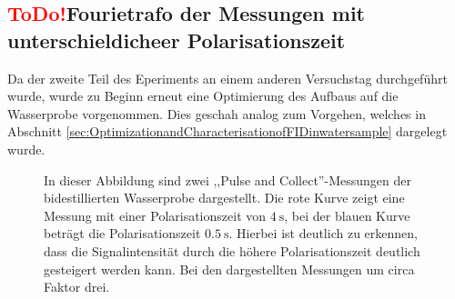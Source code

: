 \subsection{\textcolor{red}{ToDo!}Fourietrafo der Messungen mit unterschieldicheer Polarisationszeit}
\label{sec:Signalintensitaet}
Da der zweite Teil des Eperiments an einem anderen Versuchstag durchgeführt wurde, wurde zu Beginn erneut eine Optimierung des Aufbaus auf die Wasserprobe vorgenommen. Dies geschah analog zum Vorgehen, welches in Abschnitt \ref{sec:OptimizationandCharacterisationofFIDinwatersample} dargelegt wurde.
\begin{figure}[H]
    \centering
    
    \caption[Abhängigkeit der Signalintensität von der Polarisationszeit.]{In dieser Abbildung sind zwei ,,Pulse and Collect''-Messungen der bidestillierten Wasserprobe dargestellt. Die rote Kurve zeigt eine Messung mit einer Polarisationszeit von $\SI{4}{\second}$, bei der blauen Kurve beträgt die Polarisationszeit $\SI{0.5}{\second}$. Hierbei ist deutlich zu erkennen, dass die Signalintensität durch die höhere Polarisationszeit deutlich gesteigert werden kann. Bei den dargestellten Messungen um circa Faktor drei.} 
    \label{fig:SignalintensitaetPolarisationszeit}    
\end{figure}